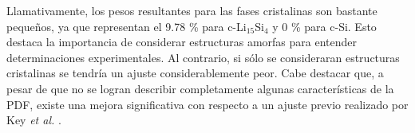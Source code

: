 \begin{table}[h!]
    \centering
    \caption{Factor de peso de cada contribución (c-Si, c-Li$_{15}$Si$_4$, a-Si y 
    a-Li$_{15}$Si$_4$) a la función distribución radial de a pares $G(r)$ del 
    Si litiado (ver las Figuras \ref{fig:gofrs} y \ref{fig:pdfs} y la ecuación 
    \ref{eq:contributions}). El porcentaje de cada peso se agrega entre paréntesis.}
    \setlength\extrarowheight{2pt}
    \label{t:w-gofrs}
\end{table}
Llamativamente, los pesos resultantes para las fases cristalinas son bastante 
pequeños, ya que representan el 9.78 \% para c-Li$_{15}$Si$_4$ y 0 \% para c-Si.
Esto destaca la importancia de considerar estructuras amorfas para entender 
determinaciones experimentales. Al contrario, si sólo se consideraran estructuras
cristalinas se tendría un ajuste considerablemente peor. Cabe destacar que, a 
pesar de que no se logran describir completamente algunas características de la 
PDF, existe una mejora significativa con respecto a un ajuste previo realizado por 
Key \textit{et al.} \cite{key2011}.
